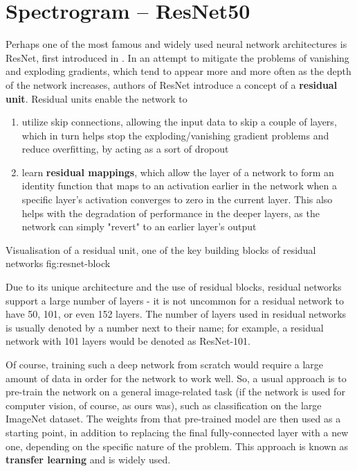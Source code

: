 \section{Spectrogram -- ResNet50}
\label{sec:spectrogram-resnet}

Perhaps one of the most famous and widely used neural network architectures is ResNet, first introduced in \cite{resnet}. In an attempt to mitigate the problems of vanishing and exploding gradients, which tend to appear more and more often as the depth of the network increases, authors of ResNet introduce a concept of a \textbf{residual unit}. Residual units enable the network to

\begin{enumerate}[label=(\alph*)]
\item utilize skip connections, allowing the input data to skip a couple of layers, which in turn helps stop the exploding/vanishing gradient problems and reduce overfitting, by acting as a sort of dropout
\item learn \textbf{residual mappings}, which allow the layer of a network to form an identity function that maps to an activation earlier in the network when a specific layer's activation converges to zero in the current layer. This also helps with the degradation of performance in the deeper layers, as the network can simply "revert" to an earlier layer's output
\end{enumerate}

	        {Visualisation of a residual unit, one of the key building blocks of residual networks \cite{resnet}}
                {fig:resnet-block}

Due to its unique architecture and the use of residual blocks, residual networks support a large number of layers - it is not uncommon for a residual network to have 50, 101, or even 152 layers. The number of layers used in residual networks is usually denoted by a number next to their name; for example, a residual network with 101 layers would be denoted as ResNet-101. 

Of course, training such a deep network from scratch would require a large amount of data in order for the network to work well. So, a usual approach is to pre-train the network on a general image-related task (if the network is used for computer vision, of course, as ours was), such as classification on the large ImageNet dataset. The weights from that pre-trained model are then used as a starting point, in addition to replacing the final fully-connected layer with a new one, depending on the specific nature of the problem. This approach is known as \textbf{transfer learning} and is widely used.

